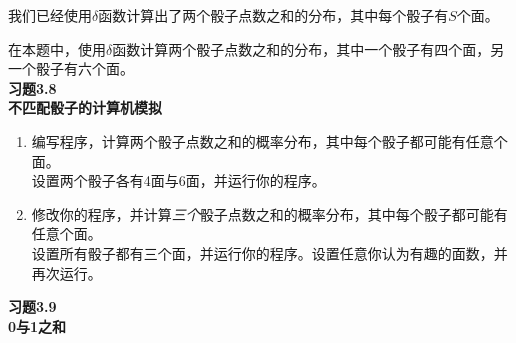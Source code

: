 \documentclass[UTF8]{ctexart}
\numberwithin{equation}{section}%
\numberwithin{figure}{section}%
\begin{document}
    我们已经使用$\delta$函数计算出了两个骰子点数之和的分布，其中每个骰子有$S$个面。

    在本题中，使用$\delta$函数计算两个骰子点数之和的分布，其中一个骰子有四个面，另一个骰子有六个面。\\
    \textbf{习题3.8}\label{prob3.8}\\
    \textbf{不匹配骰子的计算机模拟}\\
    \begin{enumerate}
        \item 编写程序，计算两个骰子点数之和的概率分布，其中每个骰子都可能有任意个面。\\
        设置两个骰子各有4面与6面，并运行你的程序。
        \item 修改你的程序，并计算\textit{三个}骰子点数之和的概率分布，其中每个骰子都可能有任意个面。\\
        设置所有骰子都有三个面，并运行你的程序。设置任意你认为有趣的面数，并再次运行。
    \end{enumerate}
    \textbf{习题3.9}\label{prob3.9}\\
    \textbf{0与1之和}\\
    
\end{document}
